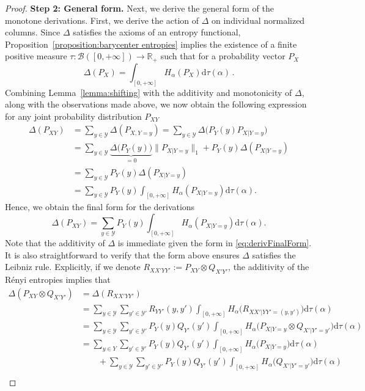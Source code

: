\documentclass[aps,pra,11pt,onecolumn,nofootinbib,tightenlines]{revtex4-2}
\theoremstyle{definition}
\def \d {\mathrm{d}}
\newcommand{\Y}{\mathcal{Y}}
\newcommand{\R}{\mathbb{R}}
\begin{document}
\begin{proof}
\medskip
\noindent \noindent\textbf{Step 2: General form.}
Next, we derive the general form of the monotone derivations. First, we derive the action of $\Delta$ on individual normalized columns. Since $\Delta$ satisfies the axioms of an entropy functional, Proposition~\ref{proposition:barycenter entropies} implies the existence of a finite positive measure $\tau \colon \mathcal{B}([0, +\infty]) \to\R_+$ such that for a probability vector $P_X$
\begin{equation}
\Delta(P_X)=\int_{[0,+\infty]}H_\alpha(P_X)\d\tau(\alpha)\,.
\end{equation}
Combining Lemma~\ref{lemma:shifting} with the additivity and monotonicity of $\Delta$, along with the observations made above, we now obtain the following expression for any joint probability distribution $P_{XY}$
\begin{align}
\Delta(P_{XY})&=\sum_{y\in \Y}\Delta(P_{X,Y=y})=\sum_{y\in \Y}\Delta\big(P_Y(y)P_{X|Y=y}\big)\\
&=\sum_{y\in \Y}\underbrace{\Delta\big(P_Y(y)\big)}_{=0}\|P_{X|Y=y}\|_1+P_Y(y)\Delta(P_{X|Y=y})\\
&=\sum_{y\in \Y}P_Y(y)\Delta(P_{X|Y=y})\\
&=\sum_{y\in \Y}P_Y(y)\int_{[0,+\infty]}H_\alpha(P_{X|Y=y})\d\tau(\alpha).
\end{align}
Hence, we obtain the final form for the derivations
\begin{equation}
\label{eq:derivFinalForm} 
    \Delta(P_{XY}) = \sum_{y\in \Y}P_Y(y)\int_{[0,+\infty]}H_\alpha(P_{X|Y=y})\d\tau(\alpha).
\end{equation}
Note that the additivity of $\Delta$ is immediate given the form in \eqref{eq:derivFinalForm}. It is also straightforward to verify that the form above ensures $\Delta$ satisfies the Leibniz rule. Explicitly, if we denote $R_{XX'YY'}:=P_{XY}\otimes Q_{X'Y'}$, the additivity
of the R\'{e}nyi entropies implies that
\begin{align}
\Delta(P_{XY}\otimes Q_{X'Y'})&=\Delta(R_{XX'YY'})\\
&=\sum_{y\in \Y}\sum_{y'\in \Y'}R_{YY'}(y,y')\int_{[0,+\infty]}H_\alpha\big(R_{XX'|YY'=(y,y')}\big)\d\tau(\alpha)\\
&=\sum_{y\in \Y}\sum_{y'\in \Y'}P_Y(y)Q_{Y'}(y')\int_{[0,+\infty]}H_\alpha\big(P_{X|Y=y}\otimes Q_{X'|Y'=y'}\big)\d\tau(\alpha)\\
&=\sum_{y\in Y}\sum_{y'\in \Y'}P_Y(y)Q_{Y'}(y')\int_{[0,+\infty]}H_\alpha\big(P_{X|Y=y}\big)\d\tau(\alpha)\\
&\qquad +\sum_{y\in \Y}\sum_{y'\in \Y'}P_Y(y)Q_{Y'}(y')\int_{[0,+\infty]}H_\alpha\big(Q_{X'|Y'=y'}\big)\d\tau(\alpha)\\

\end{align}
\end{proof}
\end{document}
